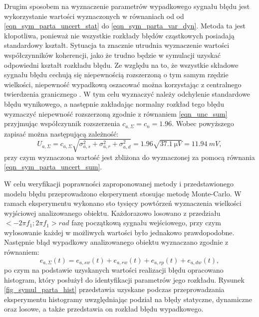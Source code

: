 Drugim sposobem na wyznaczenie parametrów wypadkowego sygnału błędu jest wykorzystanie wartości wyznaczonych w równaniach od od \eqref{eqn_sym_parta_uncert_stat} do \eqref{eqn_sym_parta_var_dyn}. Metoda ta jest kłopotliwa, ponieważ nie wszystkie rozkłady błędów cząstkowych posiadają standardowy kształt. Sytuacja ta znacznie utrudnia wyznaczenie wartości współczynników koherencji, jako że trudno będzie w symulacji uzyskać odpowiedni kształt rozkładu błędu. Ze względu na to, że wszystkie składowe sygnału błędu cechują się niepewnością rozszerzoną o tym samym rzędzie wielkości, niepewność wypadkową oszacować można korzystając z centralnego twierdzenia granicznego \cite{jcgm_guide}. W tym celu wyznaczyć należy odchylenie standardowe błędu wynikowego, a następnie zakładając normalny rozkład tego błędu wyznaczyć niepewność rozszerzoną zgodnie z równaniem \eqref{eqn_unc_sum} przyjmując współczynnik rozszerzenia $c_{a,\Sigma} = c_{n} = 1.96$. Wobec powyższego zapisać można następującą zależność:
\begin{equation}
U_{a,\Sigma} = c_{a,\Sigma} \sqrt{\sigma_{a,s}^{2} + \sigma_{a,r}^{2} + \sigma_{a,d}^{2}} = 1.96 \sqrt{\qty{37.1}{\micro V}} = \qty{11.94}{mV} \label{eqn_sym_parta_uncert_value_b},
\end{equation}
przy czym wyznaczona wartość jest zbliżona do wyznaczonej za pomocą równania \eqref{eqn_sym_parta_uncert_sum}.

W celu weryfikacji poprawności zaproponowanej metody i przedstawionego modelu błędu przeprowadzono eksperyment stosując metodę Monte-Carlo. W ramach eksperymentu wykonano sto tysięcy powtórzeń wyznaczenia wielkości wyjściowej analizowanego obiektu. Każdorazowo losowano z przedziału $<-2 \pi f_{1};2 \pi f_{1}>\unit{rad}$ fazę początkową sygnału wejściowego, przy czym wylosowanie każdej w możliwych wartości było jednakowo prawdopodobne. Następnie błąd wypadkowy analizowanego obiektu wyznaczano zgodnie z równaniem:
\begin{equation}
e_{a,\Sigma} \left( t \right) = e_{a,sw} \left( t \right) + e_{a,rw} \left( t \right) + e_{a,rp} \left( t \right) + e_{a,dw} \left( t \right) \label{eqn_sym_parta_error_sum},
\end{equation}
po czym na podstawie uzyskanych wartości realizacji błędu opracowano histogram, który posłużył do identyfikacji parametrów jego rozkładu. Rysunek \ref{fig_symul_parta_hist} przedstawia uzyskane podczas przeprowadzania eksperymentu histogramy uwzględniając podział na błędy statyczne, dynamiczne oraz losowe, a także przedstawia on rozkład błędu wypadkowego.

